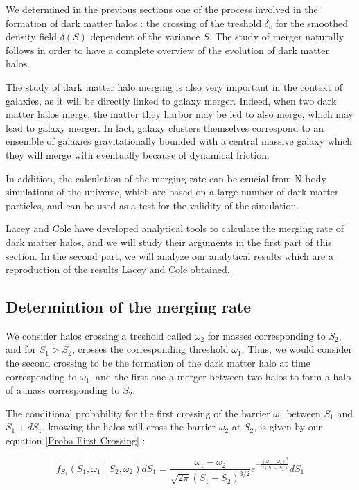 We determined in the previous sections one of the process involved in the formation of dark matter halos : the crossing of the treshold $\delta_c$ for the smoothed density field $\delta(S)$ dependent of the variance $S$. The study of merger naturally follows in order to have a complete overview of the evolution of dark matter halos.

The study of dark matter halo merging is also very important in the context of galaxies, as it will be directly linked to galaxy merger. Indeed, when two dark matter halos merge, the matter they harbor may be led to also merge, which may lead to galaxy merger.
In fact, galaxy clusters themselves correspond to an ensemble of galaxies gravitationally bounded with a central massive galaxy which they will merge with eventually because of dynamical friction.

In addition, the calculation of the merging rate can be crucial from N-body simulations of the universe, which are based on a large number of dark matter particles, and can be used as a test for the validity of the simulation.

Lacey and Cole have developed analytical tools to calculate the merging rate of dark matter halos\cite{LaC}, and we will study their arguments in the first part of this section. In the second part, we will analyze our analytical results which are a reproduction of the results Lacey and Cole obtained.

\subsection{Determintion of the merging rate}

We consider halos crossing a treshold called $\omega_2$ for masses corresponding to $S_2$, and for $S_1 > S_2$, crosses the corresponding threshold $\omega_1$. Thus, we would consider the second crossing to be the formation of the dark matter halo at time corresponding to $\omega_1$, and the first one a merger between two halos to form a halo of a mass corresponding to $S_2$.

The conditional probability for the first crossing of the barrier $\omega_1$ between $S_1$ and $S_1 + dS_1$, knowing the halos will cross the barrier $\omega_2$ at $S_2$, is given by our equation \ref{Proba First Crossing} :

\begin{equation}
\label{Cond Proba 1}
f_{S_1}(S_1, \omega_1 \mid S_2, \omega_2) dS_1 =  \frac{\omega_1 - \omega_2}{\sqrt{2\pi}(S_1 - S_2)^{3/2}} e^{-\frac{(\omega_1 - \omega_2)^2}{2(S_1 - S_2)} } dS_1
\end{equation}

